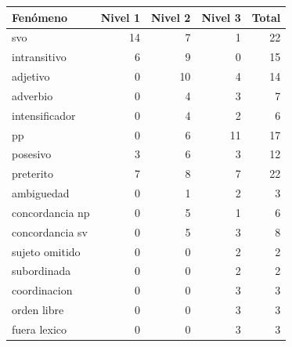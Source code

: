 \begin{tabular}{lrrrr}
\toprule
Fenómeno & Nivel 1 & Nivel 2 & Nivel 3 & Total \\
\midrule
svo & 14 & 7 & 1 & 22 \\
intransitivo & 6 & 9 & 0 & 15 \\
adjetivo & 0 & 10 & 4 & 14 \\
adverbio & 0 & 4 & 3 & 7 \\
intensificador & 0 & 4 & 2 & 6 \\
pp & 0 & 6 & 11 & 17 \\
posesivo & 3 & 6 & 3 & 12 \\
preterito & 7 & 8 & 7 & 22 \\
ambiguedad & 0 & 1 & 2 & 3 \\
concordancia np & 0 & 5 & 1 & 6 \\
concordancia sv & 0 & 5 & 3 & 8 \\
sujeto omitido & 0 & 0 & 2 & 2 \\
subordinada & 0 & 0 & 2 & 2 \\
coordinacion & 0 & 0 & 3 & 3 \\
orden libre & 0 & 0 & 3 & 3 \\
fuera lexico & 0 & 0 & 3 & 3 \\
\bottomrule
\end{tabular}
